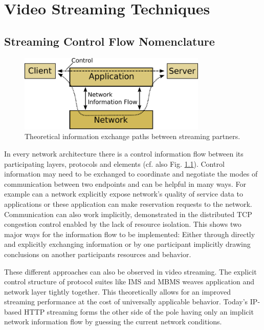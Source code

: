 \chapter{Video Streaming Techniques}
\label{chap:streaming}


\section{Streaming Control Flow Nomenclature}


\begin{figure}[htbp]
\centering
\includegraphics[width=0.8\textwidth]{images/nif.pdf}
\caption{Theoretical information exchange paths between streaming partners.}
\label{c3:fig:nif}
\end{figure}

In every network architecture there is a control information flow between its participating layers, protocols and elements (cf. also Fig. \ref{c3:fig:nif}). Control information may need to be exchanged to coordinate and negotiate the modes of communication between two endpoints and can be helpful in many ways. For example can a network explicitly expose network's quality of service data to applications or these application can make reservation requests to the network. Communication can also work implicitly, demonstrated in the distributed TCP congestion control enabled by the lack of resource isolation. This shows two major ways for the information flow to be implemented: Either through directly and explicitly exchanging information or by one participant implicitly drawing conclusions on another participants resources and behavior.

These different approaches can also be observed in video streaming. The explicit control structure of protocol suites like IMS\cite{3gpp.23.228} and MBMS weaves application and network layer tightly together. This theoretically allows for an improved streaming performance at the cost of universally applicable behavior. Today's IP-based HTTP streaming forms the other side of the pole having only an implicit network information flow by guessing the current network conditions.

